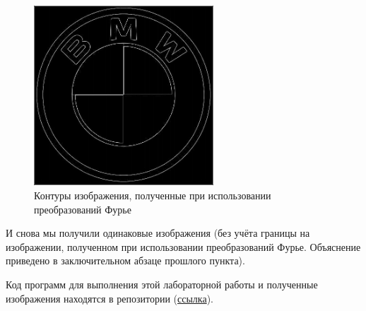 \begin{figure}[ht!]
    \centering
    \includegraphics[width=0.6\textwidth]{images/result/task_4/Edges_fourier.png}
    \caption{Контуры изображения, полученные при использовании преобразований Фурье}
    \label{fig:ed_f}
\end{figure}

И снова мы получили одинаковые изображения (без учёта границы на изображении, полученном при использовании преобразований Фурье. Объяснение приведено в заключительном абзаце прошлого пункта).

Код программ для выполнения этой лабораторной работы и полученные изображения находятся в репозитории (\href{https://github.com/NikBrat/Lab_6_CM}{ссылка}).